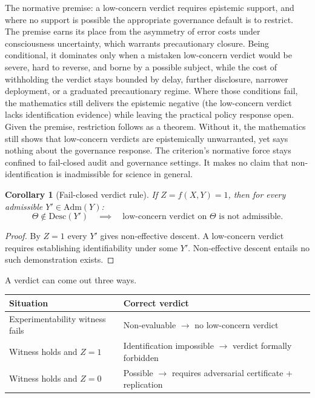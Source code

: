 \documentclass[11pt]{article}
\newtheorem{corollary}{Corollary}
\begin{document}
The normative premise: a low-concern verdict requires
epistemic support, and where no support is possible the appropriate governance
default is to restrict. The premise earns its place from the asymmetry of error
costs under consciousness uncertainty, which warrants precautionary closure.
Being conditional, it dominates only when a mistaken low-concern verdict would be
severe, hard to reverse, and borne by a possible subject, while the cost of
withholding the verdict stays bounded by delay, further disclosure, narrower
deployment, or a graduated precautionary regime. Where those conditions fail,
the mathematics still delivers the epistemic negative (the low-concern verdict
lacks identification evidence) while leaving the practical policy response open.
Given the premise, restriction follows as a theorem. Without it, the mathematics
still shows that low-concern verdicts are epistemically unwarranted, yet says
nothing about the governance response. The criterion's normative force stays
confined to fail-closed audit and governance settings. It makes no claim that
non-identification is inadmissible for science in general.

\begin{corollary}[Fail-closed verdict rule]
\label{cor:governance}
If $Z = f(X,Y) = 1$, then for every admissible $Y' \in \mathrm{Adm}(Y)$:
\[
\Theta \notin \mathrm{Desc}(Y')
\quad\implies\quad
\text{low-concern verdict on } \Theta \text{ is not admissible.}
\]
\end{corollary}

\begin{proof}
By $Z = 1$ every $Y'$ gives non-effective descent.
A low-concern verdict requires establishing identifiability under some $Y'$.
Non-effective descent entails no such demonstration exists.
\end{proof}

A verdict can come out three ways.
\begin{center}
\renewcommand{\arraystretch}{1.3}
\begin{tabular}{ll}
\toprule
Situation & Correct verdict \\
\midrule
Experimentability witness fails & Non-evaluable $\to$ no low-concern verdict \\
Witness holds and $Z = 1$       & Identification impossible $\to$ verdict formally forbidden \\
Witness holds and $Z = 0$       & Possible $\to$ requires adversarial certificate + replication \\
\bottomrule
\end{tabular}
\end{center}
\end{document}
